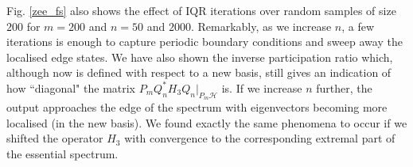 \documentclass[a4paper,10pt]{article}
\begin{document}
\begin{example}
Fig. \ref{zee_fs} also shows the effect of IQR iterations over random samples of size $200$ for $m=200$ and $n=50$ and $2000$. Remarkably, as we increase $n$, a few iterations is enough to capture periodic boundary conditions and sweep away the localised edge states. We have also shown the inverse participation ratio which, although now is defined with respect to a new basis, still gives an indication of how ``diagonal" the matrix $P_mQ_n^*H_3Q_n|_{P_m\mathcal{H}}$ is. If we increase $n$ further, the output approaches the edge of the spectrum with eigenvectors becoming more localised (in the new basis). We found exactly the same phenomena to occur if we shifted the operator $H_3$ with convergence to the corresponding extremal part of the essential spectrum.




\end{example}
\end{document}
